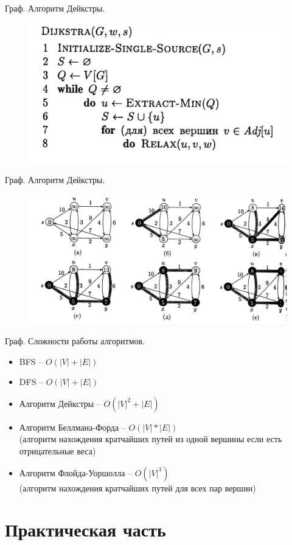 \documentclass[10pt]{beamer}
\begin{document}
\begin{frame}{Граф. Алгоритм Дейкстры.}
\begin{figure}
\centerline{\includegraphics[width=1.0\linewidth]{images/deicstra_algo.png}}
\end{figure}
\end{frame}

\begin{frame}{Граф. Алгоритм Дейкстры.}
\begin{figure}
\centerline{\includegraphics[width=1.0\linewidth]{images/deicstra_graphs.png}}
\end{figure}
\end{frame}



\begin{frame}{Граф. Сложности работы алгоритмов.}
\begin{itemize}
\item BFS -- $O(|V| + |E|)$
\item DFS -- $O(|V| + |E|)$
\item Алгоритм Дейкстры -- $O(|V|^2 + |E|)$
\item Алгоритм Беллмана-Форда -- $O(|V|*|E|)$ \\
(алгоритм нахождения кратчайших путей из одной вершины если есть отрицательные веса)
\item Алгоритм Флойда-Уоршолла -- $O(|V|^3)$ \\
(алгоритм нахождения кратчайших путей для всех пар вершин)
\end{itemize}
\end{frame}



\section{Практическая часть}
\end{document}
